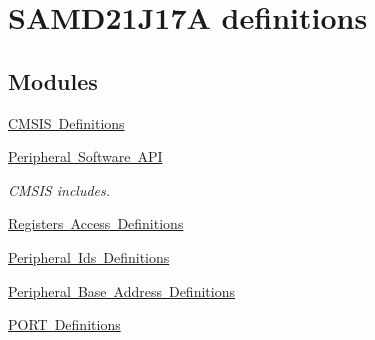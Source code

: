 \hypertarget{group___s_a_m_d21_j17_a__definitions}{}\section{S\+A\+M\+D21\+J17A definitions}
\label{group___s_a_m_d21_j17_a__definitions}
\subsection*{Modules}
\begin{DoxyCompactItemize}
\item 
\mbox{\hyperlink{group___s_a_m_d21_j17_a__cmsis}{C\+M\+S\+I\+S Definitions}}
\item 
\mbox{\hyperlink{group___s_a_m_d21_j17_a__api}{Peripheral Software A\+PI}}
\begin{DoxyCompactList}\small\item\em C\+M\+S\+IS includes. \end{DoxyCompactList}\item 
\mbox{\hyperlink{group___s_a_m_d21_j17_a__reg}{Registers Access Definitions}}
\item 
\mbox{\hyperlink{group___s_a_m_d21_j17_a__id}{Peripheral Ids Definitions}}
\item 
\mbox{\hyperlink{group___s_a_m_d21_j17_a__base}{Peripheral Base Address Definitions}}
\item 
\mbox{\hyperlink{group___s_a_m_d21_j17_a__port}{P\+O\+R\+T Definitions}}
\end{DoxyCompactItemize}
